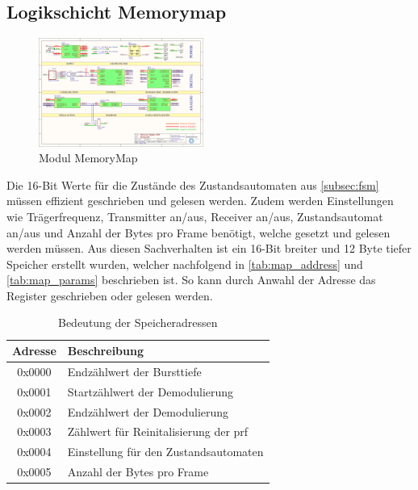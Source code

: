\subsection{Logikschicht Memorymap}\label{subsec:cpld_register}
\begin{figure}[!h]
	\centering
	\includegraphics[page=11,width=0.48\textwidth, trim=111mm 118mm 127mm 43mm, clip=true]{images/pcb/new.PDF}
	\caption{Modul MemoryMap}
	\label{fig:layer_map}
\end{figure}
Die 16-Bit Werte für die Zustände des Zustandsautomaten aus \autoref{subsec:fsm} müssen effizient geschrieben und gelesen werden. Zudem werden Einstellungen wie Trägerfrequenz, Transmitter an/aus, Receiver an/aus, Zustandsautomat an/aus und Anzahl der Bytes pro Frame benötigt, welche gesetzt und gelesen werden müssen. Aus diesen Sachverhalten ist ein 16-Bit breiter und 12 Byte tiefer Speicher erstellt wurden, welcher nachfolgend in \autoref{tab:map_address} und \autoref{tab:map_params} beschrieben ist. So kann durch Anwahl der Adresse das Register geschrieben oder gelesen werden.
\newpage
\begin{table}[h]
\centering
\caption{Bedeutung der Speicheradressen}
\label{tab:map_address}
\begin{tabular}{|c|l|}
\hline 
Adresse & Beschreibung\\  \hline
0x0000 & Endzählwert der Bursttiefe\\ \hline
0x0001 & Startzählwert der Demodulierung\\ \hline
0x0002 & Endzählwert der Demodulierung\\ \hline
0x0003 & Zählwert für Reinitalisierung der \ac{prf}\\ \hline
0x0004 & Einstellung für den Zustandsautomaten\\ \hline
0x0005 & Anzahl der Bytes pro Frame\\ \hline
\end{tabular} 
\end{table}

